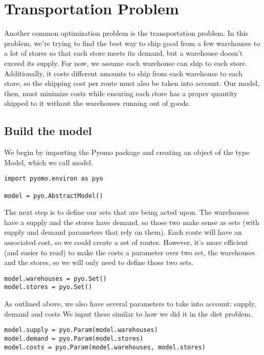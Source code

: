\documentclass{article}
\begin{document}
\section*{Transportation Problem}

Another common optimization problem is the transportation problem.  In this problem, we're trying to find the best way to ship good from a few warehouses to a lot of stores so that each store meets its demand, but a warehouse doesn't exceed its supply.  For now, we assume each warehouse can ship to each store.  Additionally, it costs different amounts to ship from each warehouse to each store, so the shipping cost per route must also be taken into account.  Our model, then, must minimize costs while ensuring each store has a proper quantity shipped to it without the warehouses running out of goods.

\subsection*{Build the model}

We begin by importing the Pyomo package and creating an object of the type Model, which we call model.

\begin{verbatim}
import pyomo.environ as pyo

model = pyo.AbstractModel()
\end{verbatim}

The next step is to define our sets that are being acted upon.  The warehouses have a supply and the stores have demand, so those two make sense as sets (with supply and demand parameters that rely on them).  Each route will have an associated cost, so we could create a set of routes.  However, it's more efficient (and easier to read) to make the costs a parameter over two set, the warehouses and the stores, so we will only need to define those two sets.

\begin{verbatim}
model.warehouses = pyo.Set()
model.stores = pyo.Set()
\end{verbatim}

As outlined above, we also have several parameters to take into account: supply, demand and costs  We input these similar to how we did it in the diet problem.

\begin{verbatim}
model.supply = pyo.Param(model.warehouses)
model.demand = pyo.Param(model.stores)
model.costs = pyo.Param(model.warehouses, model.stores)
\end{verbatim}
\end{document}
